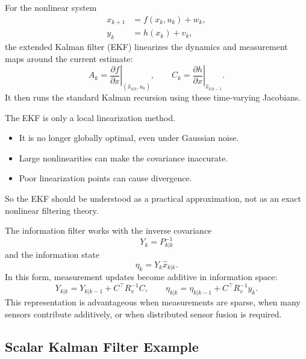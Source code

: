 \begin{definition}\label{def:l7-extended-kalman-filter}
	For the nonlinear system
	\begin{align*}
		x_{k+1} &= f(x_k,u_k) + w_k, \\
		y_k &= h(x_k) + v_k,
	\end{align*}
	the extended Kalman filter (EKF) linearizes the dynamics and measurement maps around the current estimate:
	\[
		A_k = \left.\frac{\partial f}{\partial x}\right|_{(\hat x_{k|k},u_k)},
		\qquad
		C_k = \left.\frac{\partial h}{\partial x}\right|_{\hat x_{k|k-1}}.
	\]
	It then runs the standard Kalman recursion using these time-varying Jacobians.
\end{definition}

\begin{remark}
	The EKF is only a local linearization method.
	\begin{itemize}
		\item It is no longer globally optimal, even under Gaussian noise.
		\item Large nonlinearities can make the covariance inaccurate.
		\item Poor linearization points can cause divergence.
	\end{itemize}
	So the EKF should be understood as a practical approximation, not as an exact nonlinear filtering theory.
\end{remark}

\begin{remark}
	The information filter works with the inverse covariance
	\[
		Y_k = P_{k|k}^{-1}
	\]
	and the information state
	\[
		\eta_k = Y_k \hat x_{k|k}.
	\]
	In this form, measurement updates become additive in information space:
	\[
		Y_{k|k}=Y_{k|k-1}+C^\top R_v^{-1}C,
		\qquad
		\eta_{k|k}=\eta_{k|k-1}+C^\top R_v^{-1}y_k.
	\]
	This representation is advantageous when measurements are sparse, when many sensors contribute additively, or when distributed sensor fusion is required.
\end{remark}

\subsection{Scalar Kalman Filter Example}
\label{sec:l7-scalar-kalman-filter-example}

